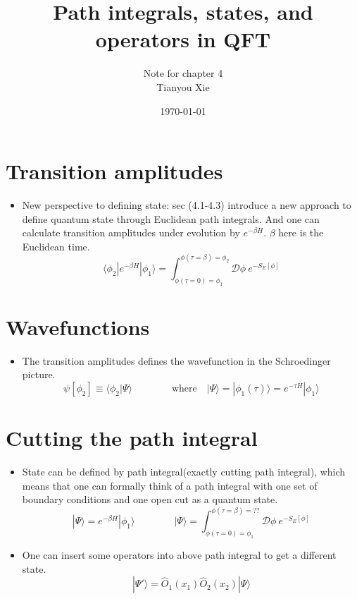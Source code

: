 \documentclass{article}
\def\beq{\begin{eqnarray}}
\def\eeq{\end{eqnarray}}
\def\beq{\begin{equation}}
\def\eeq{\end{equation}}
\begin{document}
\title{ Path integrals, states, and operators in QFT}
\author{ Note for chapter 4 \\Tianyou Xie}
\date{\today}
\maketitle

\section{ Transition amplitudes}
\begin{itemize}
\item{New perspective to defining state: sec (4.1-4.3) introduce a new approach to define quantum state through Euclidean path integrals. And one can calculate transition amplitudes under evolution by $e^{-\beta H}$. $\beta$ here is the Euclidean time.
    \beq
\langle\phi_{2}|e^{-\beta H}|\phi_{1}\rangle=\int^{\phi(\tau=\beta)=\phi_{2}}_{\phi(\tau=0)=\phi_{1}}\mathcal{D} \phi~e^{-S_{E}[\phi]}
\eeq}

\end{itemize}
\section{Wavefunctions}
\begin{itemize}
\item{The transition amplitudes defines the wavefunction in the Schroedinger picture.
\beq
 \psi[\phi_{2}]\equiv \langle\phi_{2}|\Psi\rangle  \qquad\qquad\mbox{where} \quad |\Psi\rangle=|\phi_{1}(\tau)\rangle=e^{-\tau H}|\phi_{1}\rangle
\eeq
 }
\end{itemize}
\section{Cutting the path integral}
\begin{itemize}
\item{ State can be defined by path integral(exactly cutting path integral), which means that one can formally think of a path integral with one set of boundary conditions and one open cut as a quantum state.
    \beq
    |\Psi\rangle=e^{-\beta H}|\phi_{1}\rangle \qquad\qquad  |\Psi\rangle=\int^{\phi(\tau=\beta)=??}_{\phi(\tau=0)=\phi_{1}}\mathcal{D}\phi~e^{-S_{E}[\phi]}
    \eeq
    }
\item{One can insert some operators into above path integral to get a different state.
    \beq
    |\Psi'\rangle=\hat{O}_{1}(x_1)\hat{O}_{2}(x_2)|\Psi\rangle
    \eeq
      }
    \end{itemize}
\end{document}
